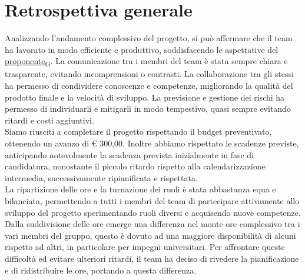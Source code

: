\section{Retrospettiva generale}
Analizzando l'andamento complessivo del progetto, si può affermare che il team ha lavorato in modo efficiente e produttivo, soddisfacendo le aspettative del \href{https://7last.github.io/docs/pb/documentazione-interna/glossario\#proponente}{proponente\textsubscript{G}}. La comunicazione tra i membri del team è stata sempre chiara e trasparente, evitando incomprensioni o contrasti. La collaborazione tra gli stessi ha permesso di condividere conoscenze e competenze, migliorando la qualità del prodotto finale e la velocità di sviluppo. La previsione e gestione dei rischi ha permesso di individuarli e mitigarli in modo tempestivo, quasi sempre evitando ritardi e costi aggiuntivi. \\
Siamo riusciti a completare il progetto rispettando il budget preventivato, ottenendo un avanzo di € 300,00. Inoltre abbiamo rispettato le scadenze previste, anticipando notevolmente la scadenza prevista inizialmente in fase di candidatura, nonostante il piccolo ritardo rispetto alla calendarizzazione intermedia, successivamente ripianificata e rispettata. \\
La ripartizione delle ore e la turnazione dei ruoli è stata abbastanza equa e bilanciata, permettendo a tutti i membri del team di partecipare attivamente allo sviluppo del progetto sperimentando ruoli diversi e acquisendo nuove competenze. Dalla suddivisione delle ore emerge una differenza nel monte ore complessivo tra i vari membri del gruppo, questo è dovuto ad una maggiore disponibilità di alcuni rispetto ad altri, in particolare per impegni universitari. Per affrontare queste difficoltà ed evitare ulteriori ritardi, il team ha deciso di rivedere la pianificazione e di ridistribuire le ore, portando a questa differenza.

